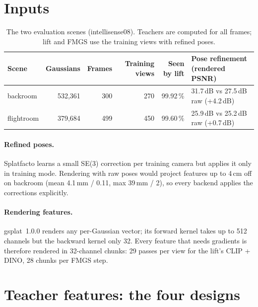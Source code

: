 \documentclass[11pt,a4paper]{article}
\begin{document}
\section{Inputs}

\begin{table}[ht]
\centering\small
\begin{tabular}{@{}lrrrrl@{}}
\toprule
Scene & Gaussians & Frames & Training views & Seen by lift & Pose refinement (rendered PSNR) \\
\midrule
backroom   & 532{,}361 & 300 & 270 & 99.92\,\% & 31.7\,dB vs 27.5\,dB raw (+4.2\,dB) \\
flightroom & 379{,}684 & 499 & 450 & 99.60\,\% & 25.9\,dB vs 25.2\,dB raw (+0.7\,dB) \\
\bottomrule
\end{tabular}
\caption{The two evaluation scenes (intellisense08). Teachers are computed for all frames; lift and FMGS use the
training views with refined poses.}
\end{table}

\paragraph{Refined poses.} Splatfacto learns a small SE(3) correction per training camera but applies it only in
training mode. Rendering with raw poses would project features up to 4\,cm off on backroom (mean 4.1\,mm /
0.11\textdegree, max 39\,mm / 2\textdegree), so every backend applies the corrections explicitly.

\paragraph{Rendering features.} gsplat~1.0.0 renders any per-Gaussian vector; its forward kernel takes up to 512
channels but the backward kernel only 32. Every feature that needs gradients is therefore rendered in 32-channel
chunks: 29 passes per view for the lift's CLIP + DINO, 28 chunks per FMGS step.

\section{Teacher features: the four designs}
\label{sec:teachers}
\end{document}

